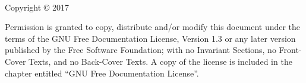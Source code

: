 
\thispagestyle{empty}

\begin{titlepage}

\thispagestyle{empty}

~\vfill

\begin{center}

\huge \doctitle

\Large \docsubtitle

\bigskip

\normalsize \docauthor

\end{center}

\vfill

\end{titlepage}

\thispagestyle{empty}

\noindent Copyright \copyright{} 2017\ \ \docauthor

\bigskip

\noindent \docsite

\bigskip

\noindent Permission is granted to copy, distribute and/or modify this document
under the terms of the GNU Free Documentation License, Version 1.3 or any later
version published by the Free Software Foundation; with no Invariant Sections,
no Front-Cover Texts, and no Back-Cover Texts.  A copy of the license is
included in the chapter entitled ``GNU Free Documentation License''.

